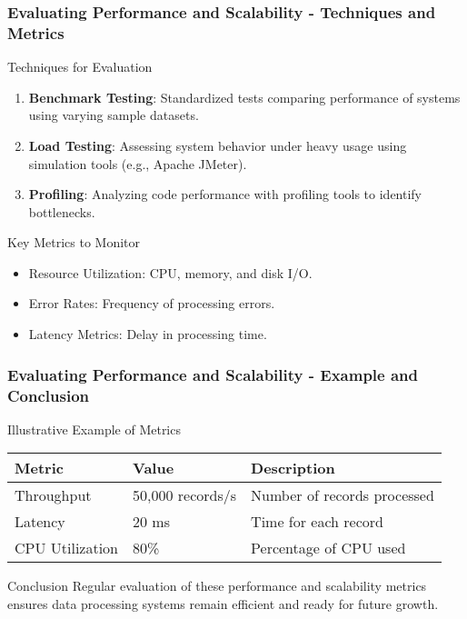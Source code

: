 \documentclass[aspectratio=169]{beamer}
\begin{document}
\begin{frame}[fragile]
    \frametitle{Evaluating Performance and Scalability - Techniques and Metrics}
    \begin{block}{Techniques for Evaluation}
        \begin{enumerate}
            \item \textbf{Benchmark Testing}: Standardized tests comparing performance of systems using varying sample datasets.
            \item \textbf{Load Testing}: Assessing system behavior under heavy usage using simulation tools (e.g., Apache JMeter).
            \item \textbf{Profiling}: Analyzing code performance with profiling tools to identify bottlenecks.
        \end{enumerate}
    \end{block}

    \begin{block}{Key Metrics to Monitor}
        \begin{itemize}
            \item Resource Utilization: CPU, memory, and disk I/O.
            \item Error Rates: Frequency of processing errors.
            \item Latency Metrics: Delay in processing time.
        \end{itemize}
    \end{block}
\end{frame}

\begin{frame}[fragile]
    \frametitle{Evaluating Performance and Scalability - Example and Conclusion}
    \begin{block}{Illustrative Example of Metrics}
        \begin{tabular}{|l|l|l|}
            \hline
            \textbf{Metric} & \textbf{Value} & \textbf{Description} \\
            \hline
            Throughput & 50,000 records/s & Number of records processed \\
            Latency & 20 ms & Time for each record \\
            CPU Utilization & 80\% & Percentage of CPU used \\
            \hline
        \end{tabular}
    \end{block}

    \begin{block}{Conclusion}
        Regular evaluation of these performance and scalability metrics ensures data processing systems remain efficient and ready for future growth.
    \end{block}
\end{frame}
\end{document}

